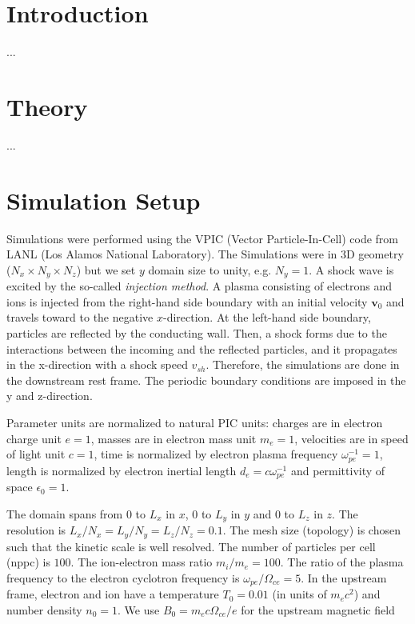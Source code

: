 \documentclass[final,5p,times,twocolumn,authoryear, draft]{elsarticle}
\begin{document}



\section{Introduction}
...

\section{Theory}
...

\section{Simulation Setup}
Simulations were performed using the VPIC (Vector Particle-In-Cell) code from LANL (Los Alamos National Laboratory). The Simulations were in 3D geometry ($N_x \times N_y \times N_z$) but we set $y$ domain size to unity, e.g. $N_y = 1$. A shock wave is excited by the so-called \textit{injection method}. A plasma consisting of electrons and ions is injected from the right-hand side boundary with an initial velocity $\bm{v}_0$ and travels toward to the negative $x$-direction.
At the left-hand side boundary, particles are reflected by the conducting wall. Then, a shock forms due to the interactions between the incoming and the reflected particles, and it propagates in the x-direction with a shock speed $v_{sh}$. Therefore, the simulations are done in the downstream rest frame. The periodic
boundary conditions are imposed in the y and z-direction.


Parameter units are normalized to natural PIC units: charges are in electron charge unit $e=1$, masses are in electron mass unit $m_e=1$, velocities are in speed of light unit $c=1$, time is normalized by electron plasma frequency $\omega_{pe}^{-1} = 1$, length is normalized by electron inertial length $d_e = c \omega_{pe}^{-1}$ and permittivity of space $\epsilon_0 = 1$. 

The domain spans from $0$ to $L_x$ in $x$, $0$ to $L_y$ in $y$ and $0$ to $L_z$ in $z$. The resolution is $L_x / N_x = L_y / N_y = L_z / N_z = 0.1$. The mesh size (topology) is chosen such that the kinetic scale is well resolved. The number of particles per cell (nppc) is $100$. The ion-electron mass ratio $m_i / m_e = 100$. The ratio of the plasma frequency to the electron cyclotron
frequency is $\omega_{pe} / \Omega_{ce} = 5$. In the upstream frame, electron and ion have a temperature $T_0 = 0.01$ (in units of $m_e c^2$) and number density $n_0=1$. We use $B_0= m_e c \Omega_{ce} / e$ for the upstream magnetic field
\end{document}
